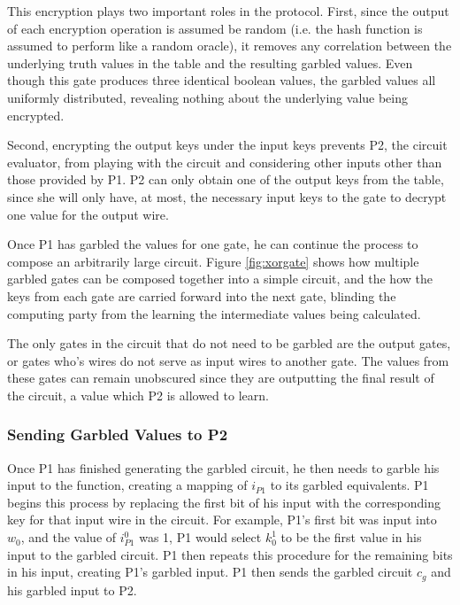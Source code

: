 This encryption plays two important roles in the protocol.  First, since the output of each encryption operation is assumed be random (i.e. the hash function is assumed to perform like a random oracle), it removes any correlation between the underlying truth values in the table and the resulting garbled values. Even though this gate produces three identical boolean values, the garbled values all uniformly distributed, revealing nothing about the underlying value being encrypted.

Second, encrypting the output keys under the input keys prevents \ac{P2}, the circuit evaluator, from playing with the circuit and considering other inputs other than those provided by \ac{P1}. \ac{P2} can only obtain one of the output keys from the table, since she will only have, at most, the necessary input keys to the gate to decrypt one value for the output wire.

Once \ac{P1} has garbled the values for one gate, he can continue the process to compose an arbitrarily large circuit.  Figure \ref{fig:xorgate} shows how multiple garbled gates can be composed together into a simple circuit, and the how the keys from each gate are carried forward into the next gate, blinding the computing party from the learning the intermediate values being calculated.

The only gates in the circuit that do not need to be garbled are the output gates, or gates who's wires do not serve as input wires to another gate.  The values from these gates can remain unobscured since they are outputting the final result of the circuit, a value which \ac{P2} is allowed to learn.


\subsubsection{Sending Garbled Values to \ac{P2}}

Once \ac{P1} has finished generating the garbled circuit, he then needs to garble his input to the function, creating a mapping of $i_{P1}$ to its garbled equivalents.  \ac{P1} begins this process by replacing the first bit of his input with the corresponding key for that input wire in the circuit.  For example, \ac{P1}'s first bit was input into $w_0$, and the value of $i^0_{P1}$ was 1, \ac{P1} would select $k^1_0$ to be the first value in his input to the garbled circuit. \ac{P1} then repeats this procedure for the remaining bits in his input, creating \ac{P1}'s garbled input. \ac{P1} then sends the garbled circuit $c_g$ and his garbled input to \ac{P2}.

